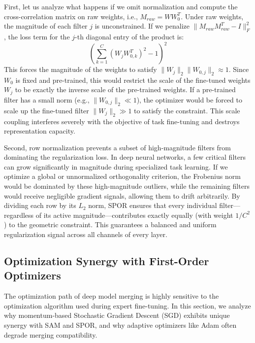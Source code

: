 \documentclass{article}
\theoremstyle{plain}
\theoremstyle{definition}
\theoremstyle{remark}
\begin{document}
First, let us analyze what happens if we omit normalization and compute the cross-correlation matrix on raw weights, i.e., $M_{raw} = W W_0^T$. Under raw weights, the magnitude of each filter $j$ is unconstrained. If we penalize $\| M_{raw} M_{raw}^T - I \|_F^2$, the loss term for the $j$-th diagonal entry of the product is:
\begin{equation}
    \left( \sum_{k=1}^C (W_{j} W_{0,k}^T)^2 - 1 \right)^2
\end{equation}
This forces the magnitude of the weights to satisfy $\|W_j\|_2 \|W_{0,j}\|_2 \approx 1$. Since $W_0$ is fixed and pre-trained, this would restrict the scale of the fine-tuned weights $W_j$ to be exactly the inverse scale of the pre-trained weights. If a pre-trained filter has a small norm (e.g., $\|W_{0,j}\|_2 \ll 1$), the optimizer would be forced to scale up the fine-tuned filter $\|W_j\|_2 \gg 1$ to satisfy the constraint. This scale coupling interferes severely with the objective of task fine-tuning and destroys representation capacity.

Second, row normalization prevents a subset of high-magnitude filters from dominating the regularization loss. In deep neural networks, a few critical filters can grow significantly in magnitude during specialized task learning. If we optimize a global or unnormalized orthogonality criterion, the Frobenius norm would be dominated by these high-magnitude outliers, while the remaining filters would receive negligible gradient signals, allowing them to drift arbitrarily. By dividing each row by its $L_2$ norm, SPOR ensures that every individual filter---regardless of its active magnitude---contributes exactly equally (with weight $1/C^2$) to the geometric constraint. This guarantees a balanced and uniform regularization signal across all channels of every layer.

\subsection{Optimization Synergy with First-Order Optimizers}
The optimization path of deep model merging is highly sensitive to the optimization algorithm used during expert fine-tuning. In this section, we analyze why momentum-based Stochastic Gradient Descent (SGD) exhibits unique synergy with SAM and SPOR, and why adaptive optimizers like Adam often degrade merging compatibility.
\end{document}
